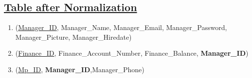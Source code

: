 \subsection*{\underline{Table after Normalization}}
\begin{enumerate}
    \item (\underline{Manager\_ID}, Manager\_Name, Manager\_Email, Manager\_Password,\\Manager\_Picture, Manager\_Hiredate)
    \item (\underline{Finance\_ID}, Finance\_Account\_Number, Finance\_Balance,\textbf{ Manager\_ID})
    \item  (\underline{Mp\_ID}, \textbf{Manager\_ID},{Manager\_Phone})
\end{enumerate}
\clearpage